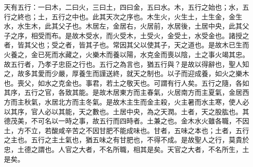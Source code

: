 天有五行：一曰木，二曰火，三曰土，四曰金，五曰水。木，五行之始也；水，五行之終也；土，五行之中也。此其天次之序也。木生火，火生土，土生金，金生水，水生木，此其父子也。木居左，金居右，火居前，水居後，土居中央，此其父子之序，相受而布。是故木受水，而火受木，土受火，金受土，水受金也。諸授之者，皆其父也；受之者，皆其子也。常因其父以使其子，天之道也。是故木已生而火養之，金已死而水藏之，火樂木而養以陽，水克金而喪以陰，土之事火竭其忠。故五行者，乃孝子忠臣之行也。五行之為言也，猶五行與？是故以得辭也，聖人知之，故多其愛而少嚴，厚養生而謹送終，就天之制也。以子而迎成養，如火之樂木也。喪父，如水之克金也。事君，若土之敬天也。可謂有行人矣。五行之隨，各如其序，五行之官，各致其能。是故木居東方而主春氣，火居南方而主夏氣，金居西方而主秋氣，水居北方而主冬氣。是故木主生而金主殺，火主暑而水主寒，使人必以其序，官人必以其能，天之數也。土居中央，為之天潤。土者，天之股肱也。其德茂美，不可名以一時之事，故五行而四時者。土兼之也。金木水火雖各職，不因土，方不立，若酸咸辛苦之不因甘肥不能成味也。甘者，五味之本也；土者，五行之主也。五行之主土氣也，猶五味之有甘肥也，不得不成。是故聖人之行，莫貴於忠，土德之謂也。人官之大者，不名所職，相其是矣。天官之大者，不名所生，土是矣。


